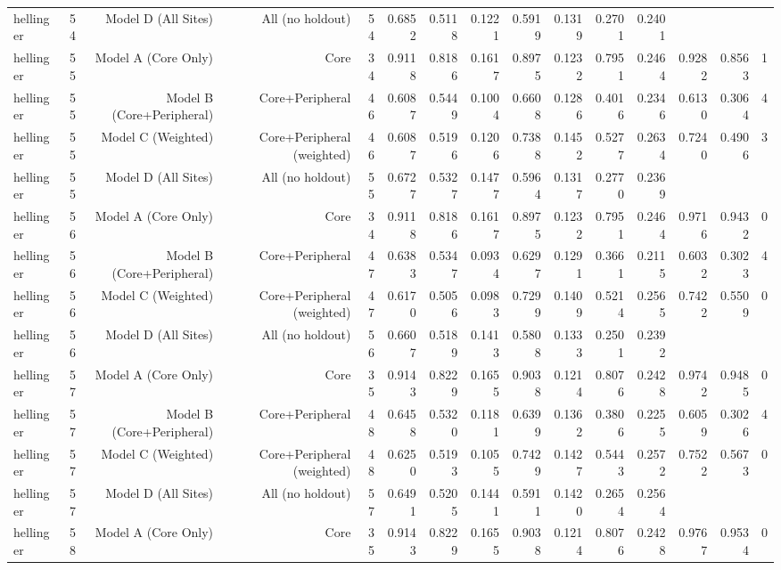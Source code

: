 {\begin{longtable}{lrrrrrrrrrrrrrr}
  hellinger & 54 & Model D (All Sites) & All (no holdout) & 54 & 0.6852 & 0.5118 & 0.1221 & 0.5919 & 0.1319 & 0.2701 & 0.2401 &  &  &  \\
  hellinger & 55 & Model A (Core Only) & Core & 34 & 0.9118 & 0.8186 & 0.1617 & 0.8975 & 0.1232 & 0.7951 & 0.2464 & 0.9282 & 0.8563 & 1 \\
  hellinger & 55 & Model B (Core+Peripheral) & Core+Peripheral & 46 & 0.6087 & 0.5449 & 0.1004 & 0.6608 & 0.1286 & 0.4016 & 0.2346 & 0.6130 & 0.3064 & 4 \\
  hellinger & 55 & Model C (Weighted) & Core+Peripheral (weighted) & 46 & 0.6087 & 0.5196 & 0.1206 & 0.7388 & 0.1452 & 0.5277 & 0.2634 & 0.7240 & 0.4906 & 3 \\
  hellinger & 55 & Model D (All Sites) & All (no holdout) & 55 & 0.6727 & 0.5327 & 0.1477 & 0.5964 & 0.1317 & 0.2770 & 0.2369 &  &  &  \\
  hellinger & 56 & Model A (Core Only) & Core & 34 & 0.9118 & 0.8186 & 0.1617 & 0.8975 & 0.1232 & 0.7951 & 0.2464 & 0.9716 & 0.9432 & 0 \\
  hellinger & 56 & Model B (Core+Peripheral) & Core+Peripheral & 47 & 0.6383 & 0.5347 & 0.0934 & 0.6297 & 0.1291 & 0.3661 & 0.2115 & 0.6032 & 0.3023 & 4 \\
  hellinger & 56 & Model C (Weighted) & Core+Peripheral (weighted) & 47 & 0.6170 & 0.5056 & 0.0983 & 0.7299 & 0.1409 & 0.5214 & 0.2565 & 0.7422 & 0.5509 & 0 \\
  hellinger & 56 & Model D (All Sites) & All (no holdout) & 56 & 0.6607 & 0.5189 & 0.1413 & 0.5808 & 0.1333 & 0.2501 & 0.2392 &  &  &  \\
  hellinger & 57 & Model A (Core Only) & Core & 35 & 0.9143 & 0.8229 & 0.1655 & 0.9038 & 0.1214 & 0.8076 & 0.2428 & 0.9742 & 0.9485 & 0 \\
  hellinger & 57 & Model B (Core+Peripheral) & Core+Peripheral & 48 & 0.6458 & 0.5320 & 0.1181 & 0.6399 & 0.1362 & 0.3806 & 0.2255 & 0.6059 & 0.3026 & 4 \\
  hellinger & 57 & Model C (Weighted) & Core+Peripheral (weighted) & 48 & 0.6250 & 0.5193 & 0.1055 & 0.7429 & 0.1427 & 0.5443 & 0.2572 & 0.7522 & 0.5673 & 0 \\
  hellinger & 57 & Model D (All Sites) & All (no holdout) & 57 & 0.6491 & 0.5205 & 0.1441 & 0.5911 & 0.1420 & 0.2654 & 0.2564 &  &  &  \\
  hellinger & 58 & Model A (Core Only) & Core & 35 & 0.9143 & 0.8229 & 0.1655 & 0.9038 & 0.1214 & 0.8076 & 0.2428 & 0.9767 & 0.9534 & 0 \\

\end{longtable}}
